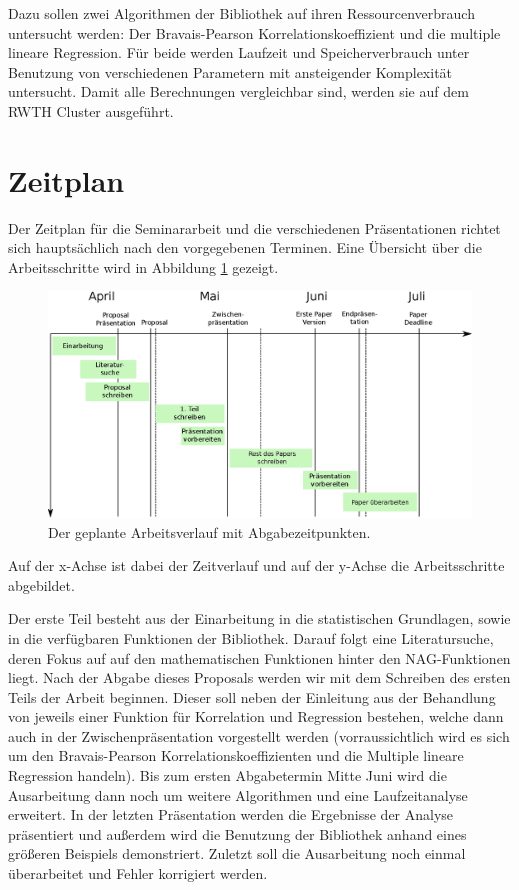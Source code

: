 \documentclass{article}
\begin{document}
Dazu sollen zwei Algorithmen der Bibliothek auf ihren Ressourcenverbrauch untersucht werden: Der Bravais-Pearson Korrelationskoeffizient und die multiple lineare Regression.
Für beide werden Laufzeit und Speicherverbrauch unter Benutzung von verschiedenen Parametern mit ansteigender Komplexität untersucht.
Damit alle Berechnungen vergleichbar sind, werden sie auf dem RWTH Cluster ausgeführt.

\section{Zeitplan}

Der Zeitplan für die Seminararbeit und die verschiedenen Präsentationen richtet sich hauptsächlich nach den vorgegebenen Terminen.
Eine Übersicht über die Arbeitsschritte wird in Abbildung \ref{fig:Zeitplan} gezeigt.
\begin{figure}[t]
 \includegraphics[width=\linewidth]{./figures/Workplan-adj-small.eps}
 \caption{Der geplante Arbeitsverlauf mit Abgabezeitpunkten.}
 \label{fig:Zeitplan} 
\end{figure}
Auf der x-Achse ist dabei der Zeitverlauf und auf der y-Achse die Arbeitsschritte abgebildet.

Der erste Teil besteht aus der Einarbeitung in die statistischen Grundlagen, sowie in die verfügbaren Funktionen der Bibliothek.
Darauf folgt eine Literatursuche, deren Fokus auf auf den mathematischen Funktionen hinter den NAG-Funktionen liegt.
Nach der Abgabe dieses Proposals werden wir mit dem Schreiben des ersten Teils der Arbeit beginnen. 
Dieser soll neben der Einleitung aus der Behandlung von jeweils einer Funktion für Korrelation und Regression bestehen, welche dann auch in der Zwischenpräsentation vorgestellt werden (vorraussichtlich wird es sich um den Bravais-Pearson Korrelationskoeffizienten und die Multiple lineare Regression handeln).
Bis zum ersten Abgabetermin Mitte Juni wird die Ausarbeitung dann noch um weitere Algorithmen und eine Laufzeitanalyse erweitert.
In der letzten Präsentation werden die Ergebnisse der Analyse präsentiert und außerdem wird die Benutzung der Bibliothek anhand eines größeren Beispiels demonstriert.
Zuletzt soll die Ausarbeitung noch einmal überarbeitet und Fehler korrigiert werden.
\end{document}
